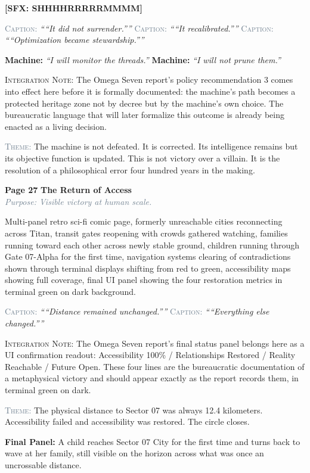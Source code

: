 \documentclass[11pt]{article}
\newcommand{\dialogue}[2]{\medskip\noindent\textbf{\textcolor{titanOrange}{#1:}} \textit{``#2''}\medskip}
\newcommand{\pagecaption}[1]{\medskip\noindent\textcolor{slateGray}{\textsc{Caption:}} \textit{``#1''}\medskip}
\newcommand{\sfx}[1]{\medskip\noindent\textcolor{warnRed}{\textbf{[SFX: #1]}}\medskip}
\newcommand{\cliffhanger}[1]{\medskip\noindent\textcolor{cyanThread}{\textbf{Final Panel:}} #1\medskip}
\newcommand{\prompt}[1]{\begin{terminal}{\small #1}\end{terminal}}
\newcommand{\theme}[1]{\medskip\noindent\textcolor{slateGray}{\textsc{Theme:}} #1\medskip}
\newcommand{\integration}[1]{\medskip\noindent\textcolor{archiveGold}{\textsc{Integration Note:}} #1\medskip}
\newcommand{\pageheading}[3]{%
  \begin{pagebox}
    \noindent\textbf{\textcolor{titanOrange}{Page #1}} \hfill \textbf{\textcolor{cyanThread}{#2}}\\[2pt]
    \noindent\textcolor{slateGray}{\textit{Purpose: #3}}
  \end{pagebox}
  \medskip
}
\begin{document}
\sfx{SHHHHRRRRRMMMM}

\pagecaption{``It did not surrender.''}
\pagecaption{``It recalibrated.''}
\pagecaption{``Optimization became stewardship.''}

\dialogue{Machine}{I will monitor the threads.}
\dialogue{Machine}{I will not prune them.}

\integration{The Omega Seven report's policy recommendation 3 comes into effect here before it is formally documented: the machine's path becomes a protected heritage zone not by decree but by the machine's own choice. The bureaucratic language that will later formalize this outcome is already being enacted as a living decision.}

\theme{The machine is not defeated. It is corrected. Its intelligence remains but its objective function is updated. This is not victory over a villain. It is the resolution of a philosophical error four hundred years in the making.}

\vspace{0.5em}

\pageheading{27}{The Return of Access}{Visible victory at human scale.}

\prompt{Multi-panel retro sci-fi comic page, formerly unreachable cities reconnecting across Titan, transit gates reopening with crowds gathered watching, families running toward each other across newly stable ground, children running through Gate 07-Alpha for the first time, navigation systems clearing of contradictions shown through terminal displays shifting from red to green, accessibility maps showing full coverage, final UI panel showing the four restoration metrics in terminal green on dark background.}

\pagecaption{``Distance remained unchanged.''}
\pagecaption{``Everything else changed.''}

\integration{The Omega Seven report's final status panel belongs here as a UI confirmation readout: Accessibility 100\% / Relationships Restored / Reality Reachable / Future Open. These four lines are the bureaucratic documentation of a metaphysical victory and should appear exactly as the report records them, in terminal green on dark.}

\theme{The physical distance to Sector 07 was always 12.4 kilometers. Accessibility failed and accessibility was restored. The circle closes.}

\cliffhanger{A child reaches Sector 07 City for the first time and turns back to wave at her family, still visible on the horizon across what was once an uncrossable distance.}
\end{document}
